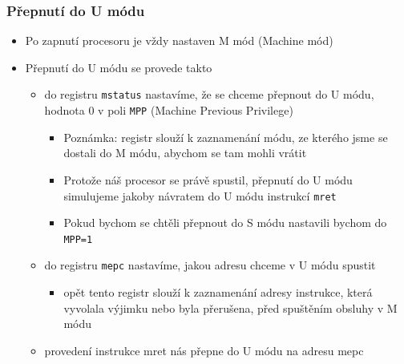 \documentclass[aspectratio=169]{beamer}
\begin{document}
\begin{frame}
\frametitle{Přepnutí do U módu}

\begin{itemize}
 \item Po zapnutí procesoru je vždy nastaven M mód (Machine mód)
\item Přepnutí do U módu se provede takto
 \begin{itemize}
 \item do registru \texttt{mstatus} nastavíme, že se chceme přepnout do U módu, hodnota 0 v poli \texttt{MPP} (Machine Previous Privilege)
\begin{itemize}
 \item Poznámka: registr slouží k zaznamenání módu, ze kterého jsme se dostali do M módu, abychom se tam mohli vrátit
 \item Protože náš procesor se právě spustil, přepnutí do U módu simulujeme jakoby návratem do U módu instrukcí \texttt{mret}
 \item Pokud bychom se chtěli přepnout do S módu nastavili bychom do \texttt{MPP=1}
\end{itemize}
 \item do registru \texttt{mepc} nastavíme, jakou adresu chceme v U módu spustit
\begin{itemize}
 \item opět tento registr slouží k zaznamenání adresy instrukce, která vyvolala výjimku nebo byla přerušena, před spuštěním obsluhy v M módu
\end{itemize}
 \item provedení instrukce mret nás přepne do U módu na adresu mepc
\end{itemize}
\end{itemize}
\end{frame}
\end{document}
